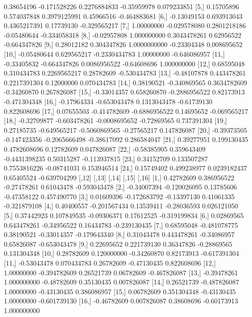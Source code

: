 \documentclass[a4paper, 12pt]{article}
\begin{document}
\begin{table}[H]
\begin{Schunk}
\begin{Soutput}
 [4,]  0.38654196 -0.171528226  0.2276884833 -0.35959978  0.079233851
 [5,]  0.15705896  0.574037848  0.3979125991  0.45966516 -0.464883681
 [6,] -0.13049153  0.693913043  0.4365217391  0.17739130 -0.329565217
 [7,]  1.00000000 -0.029578080  0.2801218186 -0.05480644 -0.334058318
 [8,] -0.02957808  1.000000000  0.3043478261  0.62956522 -0.664347826
 [9,]  0.28012182  0.304347826  1.0000000000 -0.23304348  0.008695652
[10,] -0.05480644  0.629565217 -0.2330434783  1.00000000 -0.646086957
[11,] -0.33405832 -0.664347826  0.0086956522 -0.64608696  1.000000000
[12,]  0.68595048  0.310434783  0.2269565217  0.28782609 -0.530434783
[13,] -0.48107878  0.443478261  0.2217391304  0.12000000  0.070434783
[14,]  0.38190521 -0.340869565  0.3634782609 -0.34260870  0.267826087
[15,] -0.33014357  0.658260870 -0.2886956522  0.82173913 -0.471304348
[16,] -0.17964334 -0.653043478  0.1313043478 -0.61739130  0.822608696
[17,]  0.07655503 -0.414782609 -0.6886956522  0.14695652 -0.069565217
[18,] -0.32709877 -0.603478261 -0.0008695652 -0.72869565  0.737391304
[19,]  0.27185735 -0.649565217 -0.5060869565 -0.27565217  0.147826087
[20,] -0.39373505 -0.147423356 -0.2065666498 -0.38617092  0.286584047
[21,]  0.39277951  0.199130435  0.4782608696  0.12782609  0.047826087
[22,] -0.58385905  0.359643409 -0.4431398235  0.50315287 -0.113937815
[23,]  0.34152709  0.133507287  0.7553816226 -0.08741031  0.153946514
[24,]  0.15749402  0.499238977  0.0239182437  0.65405524 -0.639704299
            [,12]        [,13]       [,14]       [,15]        [,16]
 [1,]  0.42782609  0.386956522 -0.27478261  0.61043478 -0.593043478
 [2,] -0.34007394 -0.120026095  0.13785606 -0.47358122  0.457490770
 [3,]  0.01609396 -0.172683792 -0.13397130  0.41061335 -0.321879108
 [4,]  0.40400557 -0.201567434  0.13539411 -0.28036593  0.026121050
 [5,]  0.37442923  0.107849535 -0.09306371  0.17612525 -0.319199834
 [6,]  0.02869565  0.643478261 -0.34956522  0.16434783 -0.239130435
 [7,]  0.68595048 -0.481078775  0.38190521 -0.33014357 -0.179643340
 [8,]  0.31043478  0.443478261 -0.34086957  0.65826087 -0.653043478
 [9,]  0.22695652  0.221739130  0.36347826 -0.28869565  0.131304348
[10,]  0.28782609  0.120000000 -0.34260870  0.82173913 -0.617391304
[11,] -0.53043478  0.070434783  0.26782609 -0.47130435  0.822608696
[12,]  1.00000000 -0.394782609  0.26521739  0.06782609 -0.467826087
[13,] -0.39478261  1.000000000 -0.48782609  0.35130435  0.007826087
[14,]  0.26521739 -0.487826087  1.00000000 -0.43130435  0.386086957
[15,]  0.06782609  0.351304348 -0.43130435  1.00000000 -0.601739130
[16,] -0.46782609  0.007826087  0.38608696 -0.60173913  1.000000000

\end{Soutput}
\end{Schunk}
\end{table}
\end{document}
